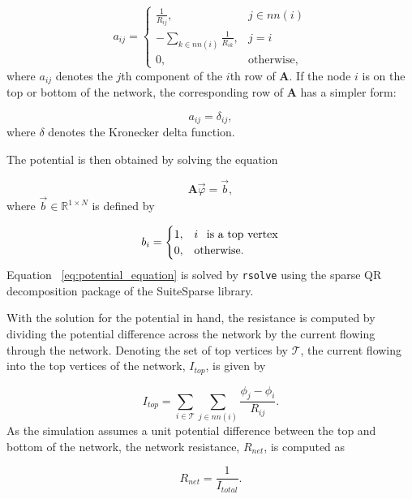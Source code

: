 \documentclass{article}
\begin{document}
\begin{equation}
a_{ij} =
\begin{cases}
\frac{1}{R_{ij}}, & j \in nn(i)\\
-\sum_{k \in nn(i)} \frac{1}{R_{ik}}, & j = i\\
0, & \text{otherwise},
\end{cases}
\end{equation}
where $a_{ij}$ denotes the $j$th component of the $i$th row of $\mathbf{A}$. If
the node $i$ is on the top or bottom of the network, the corresponding row of 
$\mathbf{A}$ has a simpler form:

\begin{equation}
a_{ij} = \delta_{ij}, 
\end{equation}
where $\delta$ denotes the Kronecker delta function.

The potential is then obtained by solving the equation

\begin{equation}
\label{eq:potential_equation}
\mathbf{A} \vec{\varphi} = \vec{b},
\end{equation}
where $\vec{b} \in \mathbb{R}^{1 \times N}$ is defined by

\begin{equation}
b_{i} = \begin{cases}
1, & i \text{\hspace{1ex} is a top vertex}\\
0, & \text{otherwise}.
\end{cases}
\end{equation}
Equation ~\eqref{eq:potential_equation} is solved by \texttt{rsolve} using
the sparse QR decomposition package of the SuiteSparse library.

With the solution for the potential in hand, the resistance is computed by
dividing the potential difference across the network by the current flowing
through the network. Denoting the set of top vertices by $\mathcal{T}$,
the current flowing into the top vertices of the network, $I_{top}$, is given
by

\begin{equation}
I_{top} = \sum_{i \in \mathcal{T}} \sum_{j \in nn(i)} \frac{\phi_j - \phi_i}{R_{ij}}.
\end{equation}
As the simulation assumes a unit potential difference between the top and
bottom of the network, the network resistance, $R_{net}$, is computed as

\begin{equation}
R_{net} = \frac{1}{I_{total}}.
\end{equation}

\nocite{*}

{}
\end{document}
